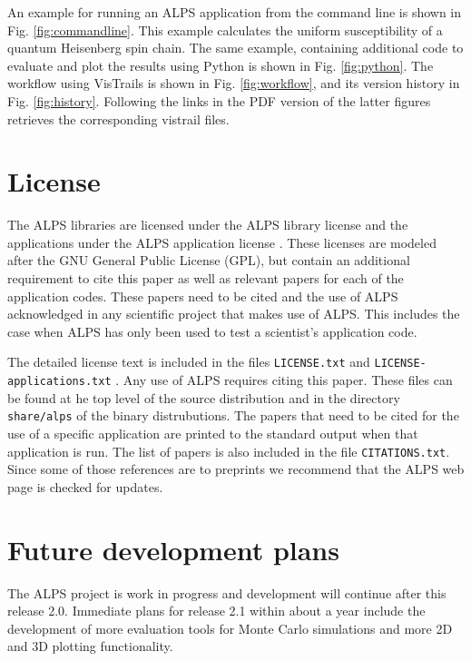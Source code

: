\documentclass[12pt]{iopart}
\begin{document}
An example for running an ALPS application from the command line is shown in Fig. \ref{fig:commandline}. This example calculates the uniform susceptibility of a quantum Heisenberg spin chain. The same example, containing additional code to evaluate and plot the results  using Python is shown in Fig. \ref{fig:python}. The workflow using VisTrails is shown in Fig. \ref{fig:workflow}, and its version history in Fig. \ref{fig:history}. Following the links in the PDF version of the latter figures retrieves the corresponding vistrail files.

\section{License}
The ALPS libraries are licensed under the ALPS library license \cite{librarylicense} and the applications under the ALPS application license  \cite{applicationlicense}. These licenses are modeled after the GNU General Public License (GPL), but contain an additional requirement to cite this paper as well as relevant papers for each of the application codes. These papers need to be cited and the use of ALPS acknowledged in any scientific project that makes use of ALPS. This includes the case when ALPS has only been used to test a scientist's application code.

The detailed license text is included in the files {\tt LICENSE.txt} \cite{librarylicense} and {\tt LICENSE-applications.txt}  \cite{applicationlicense}. Any use of ALPS requires citing this paper.  These files can be found at he top level of the source distribution and in the directory {\tt share/alps} of the binary distrubutions. The papers that need to be cited for the use of a specific application are printed to the standard output when that application is run. The list of papers is also included in the file {\tt CITATIONS.txt}. Since some of those references are to preprints we recommend that the ALPS web page \cite{alps} is checked for updates.

\section{Future development plans}

The ALPS project is work in progress and development will continue after this release 2.0. Immediate plans for release 2.1 within about a year include the development of  more evaluation tools for Monte Carlo simulations and more 2D and 3D plotting functionality.
\end{document}
